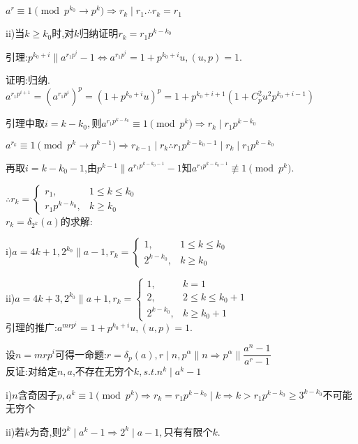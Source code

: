 $ a^r\equiv1 \pmod{p^{k_0}\rightarrow p^k}\Rightarrow r_k\mid r_1. \therefore r_k=r_1$

ii)当$ k\ge k_0$时,对$k $归纳证明$ r_k=r_1 p^{k-k_0}$

引理:$ p^{k_0+i}\parallel a^{r_1p^i}-1\Leftrightarrow a^{r_1p^i}=1+p^{k_0+i}u,(u,p)=1$.

证明:归纳.
$ a^{r_1p^{i+1}}=(a^{r_1p^i})^p=(1+p^{k_0+i}u)^p=1+p^{k_0+i+1}(1+C_p^2u^2p^{k_0+i-1})$

引理中取$ i=k-k_0,$则$ a^{r_1p^{k-k_0}}\equiv 1 \pmod{p^k}\Rightarrow r_k \mid r_1p^{k-k_0}$

$ a^{r_k}\equiv 1\pmod{p^k \rightarrow p^{k-1}}\Rightarrow r_{k-1}\mid r_k \therefore r_1p^{k-k_0-1}\mid r_k \mid r_1p^{k-k_0}$

再取$ i=k-k_0-1$,由$ p^{k-1}\parallel a^{r_1p^{k-k_0-1}}-1$知$ a^{r_1p^{k-k_0-1}}\not \equiv 1 \pmod{p^k}.$


$  \therefore r_k=
\begin{cases}
r_1, & 1\le k \le k_0 \\
r_1p^{k-k_0}, & k\ge k_0 
\end{cases} 
$
\\

$ r_k=\delta_{2^k}(a)$的求解:

i)$ a=4k+1,2^{k_0}\parallel a-1,r_k=
\begin{cases}
1,& 1\le k \le k_0 \\ 
2^{k-k_0},& k\ge k_0 
\end{cases}
$ 

ii)$ a=4k+3,2^{k_0}\parallel a+1,r_k=
\begin{cases} 
1,& k=1 \\ 
2,& 2\le k\le k_0+1 \\ 
2^{k-k_0},& k\ge k_0+1 
\end{cases}$
\\

引理的推广:$ a^{mrp^i}=1+p^{k_0+i}u,(u,p)=1.$

设$ n=mrp^i$可得一命题:$ r=\delta_p(a),r\mid n,p^{\alpha}\parallel n\Rightarrow p^{\alpha}\parallel \dfrac{a^n-1}{a^r-1} $
\\

反证:对给定$ n,a$,不存在无穷个$ k,s.t.n^k\mid a^k-1$

i)$ n$含奇因子$ p,a^k\equiv 1 \pmod {p^k}\Rightarrow r_k=r_1p^{k-k_0}\mid k\Rightarrow k>r_1p^{k-k_0}\ge 3^{k-k_0}$不可能无穷个

ii)若$ k$为奇,则$ 2^k\mid a^k-1\Rightarrow 2^k\mid a-1,$只有有限个$ k$.

